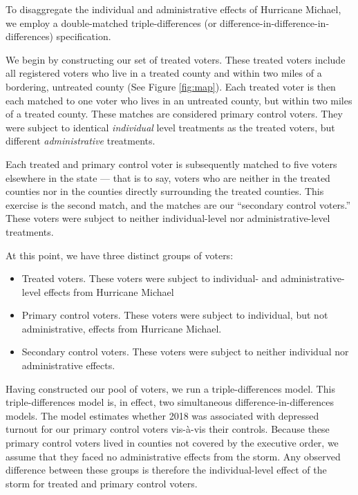 \documentclass[
  12pt,
]{article}
\providecommand{\tightlist}{%
  \setlength{\itemsep}{0pt}\setlength{\parskip}{0pt}}
\begin{document}
To disaggregate the individual and administrative effects of Hurricane Michael, we employ a double-matched triple-differences (or difference-in-difference-in-differences) specification.

We begin by constructing our set of treated voters. These treated voters include all registered voters who live in a treated county and within two miles of a bordering, untreated county (See Figure \ref{fig:map}). Each treated voter is then each matched to one voter who lives in an untreated county, but within two miles of a treated county. These matches are considered primary control voters. They were subject to identical \emph{individual} level treatments as the treated voters, but different \emph{administrative} treatments.

Each treated and primary control voter is subsequently matched to five voters elsewhere in the state --- that is to say, voters who are neither in the treated counties nor in the counties directly surrounding the treated counties. This exercise is the second match, and the matches are our ``secondary control voters.'' These voters were subject to neither individual-level nor administrative-level treatments.

At this point, we have three distinct groups of voters:

\begin{itemize}
\tightlist
\item
  Treated voters. These voters were subject to individual- and administrative-level effects from Hurricane Michael
\item
  Primary control voters. These voters were subject to individual, but not administrative, effects from Hurricane Michael.
\item
  Secondary control voters. These voters were subject to neither individual nor administrative effects.
\end{itemize}

Having constructed our pool of voters, we run a triple-differences model. This triple-differences model is, in effect, two simultaneous difference-in-differences models. The model estimates whether 2018 was associated with depressed turnout for our primary control voters vis-à-vis their controls. Because these primary control voters lived in counties not covered by the executive order, we assume that they faced no administrative effects from the storm. Any observed difference between these groups is therefore the individual-level effect of the storm for treated and primary control voters.
\end{document}
